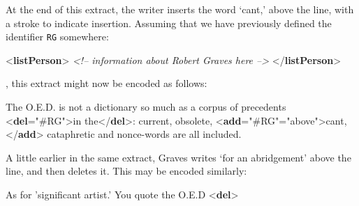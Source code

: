  At the end of this extract, the writer inserts the word ‘cant,’ above the line, with a stroke to indicate insertion. Assuming that we have previously defined the identifier \texttt{RG} somewhere: \par\bgroup{}\exampleFont \begin{shaded}\noindent\mbox{}{<\textbf{listPerson}>}\mbox{}\newline 
{}\mbox{}\newline 
\textit{<!-- information about Robert Graves here -->}\mbox{}\newline 
{}\mbox{}\newline 
{</\textbf{listPerson}>}\end{shaded}\egroup\par \noindent , this extract might now be encoded as follows: \par\bgroup{}\exampleFont \begin{shaded}\noindent\mbox{} The O.E.D. is not a\mbox{}\newline 
 dictionary so much as a corpus of precedents {<\textbf{del}\hspace*{1em}{hand}="{\#RG}">}in the{</\textbf{del}>}:\mbox{}\newline 
 current, obsolete, {<\textbf{add}\hspace*{1em}{hand}="{\#RG}"\hspace*{1em}{place}="{above}">}cant,{</\textbf{add}>} cataphretic and\mbox{}\newline 
 nonce-words are all included. \end{shaded}\egroup\par \noindent  A little earlier in the same extract, Graves writes ‘for an abridgement’ above the line, and then deletes it. This may be encoded similarly: \par\bgroup{}\exampleFont \begin{shaded}\noindent\mbox{} As for 'significant artist.' You quote the O.E.D {<\textbf{del}>}\mbox{}\newline 

\end{shaded}
